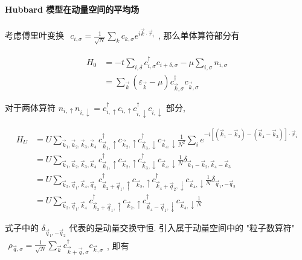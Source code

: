 \documentclass[../../main.tex]{subfiles}
\begin{document}
\paragraph{Hubbard 模型在动量空间的平均场}
考虑傅里叶变换 $\begin{aligned}
  c_{i,\sigma} = \frac{1}{\sqrt{N}}\sum_{k}c_{k,\sigma}e^{i\vec{k}\cdot\vec{r}_{i}}
\end{aligned}$, 那么单体算符部分有

\begin{align*}
  H_{0} &= - t\sum_{i,\delta}c_{i,\sigma}^{\dagger}c_{i+\delta,\sigma} - \mu\sum_{i,\sigma}n_{i,\sigma}\\
  &= \sum_{\vec{k}}(\varepsilon_{\vec{k}} - \mu)c^{\dagger}_{\vec{k},\sigma}c_{\vec{k},\sigma}
\end{align*}

对于两体算符 $n_{i,\uparrow}n_{i,\downarrow}=c^{\dagger}_{i,\uparrow}c_{i,\uparrow}c^{\dagger}_{i,\downarrow}c_{i,\downarrow}$ 部分, 

\begin{align*}
  H_{U} &= U\sum_{\vec{k}_{1},\vec{k}_{2},\vec{k}_{3},\vec{k}_{4}}c_{\vec{k}_{1},\uparrow}^{\dagger}c_{\vec{k}_{2},\uparrow}c_{\vec{k}_{3},\downarrow}^{\dagger}c_{\vec{k}_{4},\downarrow}\frac{1}{N^{2}}\sum_{i}e^{-i[(\vec{k}_{1} - \vec{k}_{2}) - (\vec{k}_{4} - \vec{k}_{3})]\cdot\vec{r}_{i}}\\
  &= U\sum_{\vec{k}_{1},\vec{k}_{2},\vec{k}_{3},\vec{k}_{4}}c_{\vec{k}_{1},\uparrow}^{\dagger}c_{\vec{k}_{2},\uparrow}c_{\vec{k}_{3},\downarrow}^{\dagger}c_{\vec{k}_{4},\downarrow}\frac{1}{N}\delta_{\vec{k}_{1}-\vec{k}_{2},\vec{k}_{4}-\vec{k}_{3}}\\
  &= U\sum_{\vec{k}_{2},\vec{q}_{1},\vec{k}_{4},\vec{q}_{2}}c^{\dagger}_{\vec{k}_{2} + \vec{q}_{1},\uparrow}c_{\vec{k}_{2},\uparrow}c^{\dagger}_{\vec{k}_{4}+\vec{q}_{2},\downarrow}c_{\vec{k}_{4},\downarrow}\frac{1}{N}\delta_{\vec{q}_{1},-\vec{q}_{2}}\\
  &= U\sum_{\vec{k}_{2},\vec{q}_{1},\vec{k}_{4}}c^{\dagger}_{\vec{k}_{2} + \vec{q}_{1},\uparrow}c_{\vec{k}_{2},\uparrow}c^{\dagger}_{\vec{k}_{4}-\vec{q}_{1},\downarrow}c_{\vec{k}_{4},\downarrow}\frac{1}{N}
\end{align*}

式子中的 $\delta_{\vec{q}_{1},-\vec{q}_{2}}$ 代表的是动量交换守恒. 引入属于动量空间中的 "粒子数算符" $\begin{aligned}
  \rho_{\vec{q},\sigma} = \frac{1}{\sqrt{N}}\sum_{\vec{k}}c^{\dagger}_{\vec{k} + \vec{q},\sigma}c_{\vec{k},\sigma}
\end{aligned}$, 即有
\end{document}
